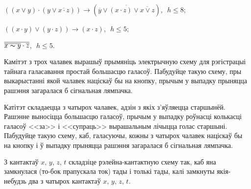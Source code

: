 \begin{problemList}
\begin{belarusianEnumerate}
			\item $((x \vee y) \cdot (y \vee \overline{x \cdot z})) \to (\overline{\overline{y} \vee
				(x \cdot z) \vee \overline{x \vee z}})$,\,\, $h \le 8$;
			
			\item $((x \cdot y) \vee (y \cdot z)) \to (x \cdot z)$,\,\, $h \le 5$;
			
			\item $\overline{\overline{x \thicksim y} \cdot \overline{z}}$,\,\, $h \le 5$.
		\end{belarusianEnumerate}
	
		\bigskip
		
		\item Камітэт з трох чалавек вырашыў прымяніць электрычную схему для рэгістрацыі тайнага галасавання простай большасцю галасоў. Пабудуйце такую схему, пры выкарыстанні якой чалавек націскаў бы на кнопку, прычым у выпадку прыняцца рашэння загаралася б сігнальная лямпачка.\\
		
		\bigskip
		
		\item Катітэт складаецца з чатырох чалавек, адзін з якіх з'яўляецца старшынёй. Рашэнне выносіцца большасцю галасоў, прычым у выпадку роўнасці колькасці галасоў <<за>> і <<супраць>> вырашальным лічыцца голас старшыні. Пабудуйце такую схему, каб, галасуючы, кожны з чатырох чалавек націскаў бы на кнопку і ў выпадку прыняцца рашэння загаралася б сігнальная лямпачка. \\
		
		 \bigskip
		 
		 \item З кантактаў $x$, $y$, $z$, $t$ складзіце рэлейна-кантактную схему так, каб яна замкнулася (то-бок прапускала ток) тады і толькі тады, калі замкнуты якія-небудзь два з чатырох кантактаў $x$, $y$, $z$, $t$. \\
	\end{problemList}
